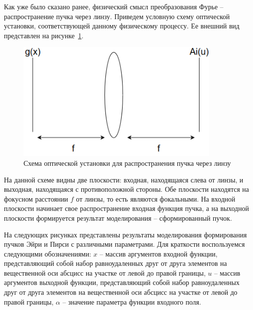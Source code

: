 {    Как уже было сказано ранее, физический смысл преобразования Фурье -- распространение пучка через линзу.
    Приведем условную схему оптической установки, соответствующей данному физическому процессу.
    Ее внешний вид представлен на рисунке~\ref{four_sys}.
    \begin{figure}[H]
        \begin{center}
            \includegraphics[width=10cm]{plots/four_sys}
            \caption{Схема оптической установки для распространения пучка через линзу}
            \label{four_sys}
        \end{center}
    \end{figure}

    На данной схеме видны две плоскости: входная, находящаяся слева от линзы, и выходная,
    находящаяся с противоположной стороны. Обе плоскости находятся на фокусном расстоянии $f$ от линзы,
    то есть являются фокальными. На входной плоскости начинает свое распространение входная функция пучка,
    а на выходной плоскости формируется результат моделирования -- сформированный пучок.

    На следующих рисунках представлены результаты моделирования
    формирования пучков Эйри и Пирси с различными параметрами. Для
    краткости воспользуемся следующими обозначениями: $x$ – массив аргументов
    входной функции, представляющий собой набор равноудаленных друг от друга
    элементов на вещественной оси абсцисс на участке от левой до правой
    границы, $u$ – массив аргументов выходной функции, представляющий собой
    набор равноудаленных друг от друга элементов на вещественной оси абсцисс
    на участке от левой до правой границы, $\alpha$ – значение параметра функции
    входного поля.

}

